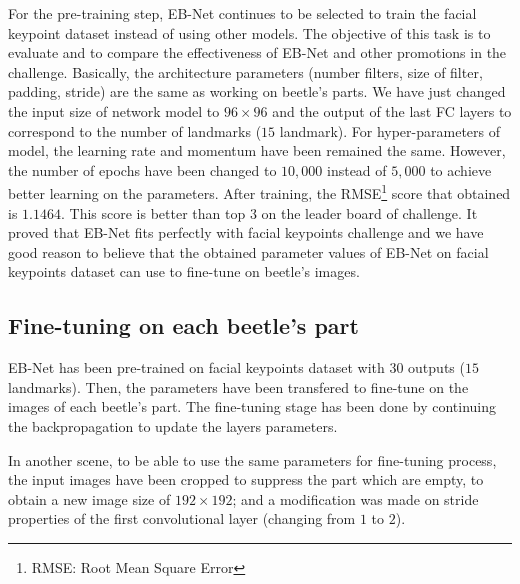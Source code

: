 \documentclass[review]{elsarticle}
\begin{document}
For the pre-training step, EB-Net continues to be selected to train the facial keypoint dataset instead of using other models. The objective of this task is to evaluate and to compare the effectiveness of EB-Net and other promotions in the challenge. Basically, the architecture parameters (number filters, size of filter, padding, stride) are the same as working on beetle's parts. We have just changed the input size of network model to $96 \times 96$ and the output of the last FC layers to correspond to the number of landmarks ($15$ landmark). For hyper-parameters of model, the learning rate and momentum have been remained the same. However, the number of epochs have been changed to $10,000$ instead of $5,000$ to achieve better learning on the parameters. After training, the RMSE\footnote{RMSE: Root Mean Square Error} score that obtained is $1.1464$. This score is better than top $3$ on the leader board of challenge. It proved that EB-Net fits perfectly with facial keypoints challenge and we have good reason to believe that the obtained parameter values of EB-Net on facial keypoints dataset can use to fine-tune on beetle's images.
\subsection{Fine-tuning on each beetle's part}
EB-Net has been pre-trained on facial keypoints dataset with $30$ outputs ($15$ landmarks). Then, the parameters have been transfered to fine-tune on the images of each beetle's part. The fine-tuning stage has been done by continuing the backpropagation to update the layers parameters.

In another scene, to be able to use the same parameters for fine-tuning process, the input images have been cropped to suppress the part which are empty, to obtain a new image size of $192 \times 192$; and a modification was made on stride properties of the first convolutional layer (changing from $1$ to $2$).
\end{document}

